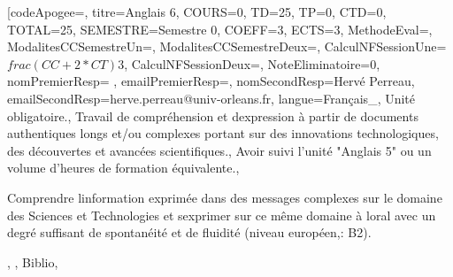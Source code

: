 \module[codeApogee={},
titre={Anglais 6},
COURS={0},
TD={25},
TP={0},
CTD={0},
TOTAL={25},
SEMESTRE={Semestre 0},
COEFF={3},
ECTS={3},
MethodeEval={},
ModalitesCCSemestreUn={},
ModalitesCCSemestreDeux={},
CalculNFSessionUne={$frac{(CC+2*CT)}{3}$},
CalculNFSessionDeux={},
NoteEliminatoire={0},
nomPremierResp={ },
emailPremierResp={},
nomSecondResp={Hervé Perreau},
emailSecondResp={herve.perreau@univ-orleans.fr},
langue={Français_},
{Unité obligatoire.},
{Travail de compréhension et dexpression à partir de documents authentiques longs et/ou complexes portant sur des innovations technologiques, des découvertes et avancées scientifiques.},
{Avoir suivi l'unité "Anglais 5" ou un volume d'heures de formation équivalente.},
{\begin{itemize}
\ObjItem Comprendre linformation exprimée dans des messages complexes sur le domaine des Sciences et Technologies et sexprimer sur ce même domaine à loral avec un degré suffisant de spontanéité et de fluidité (niveau européen,: B2).
\end{itemize}},
{},
{Biblio},

\vfill



